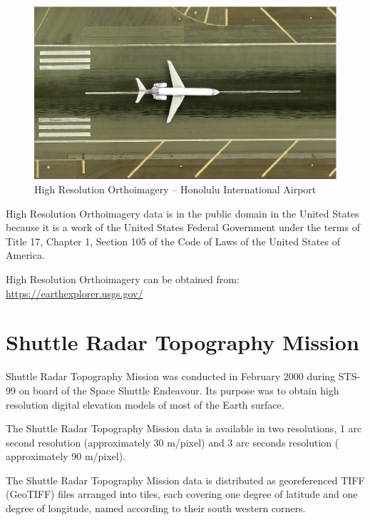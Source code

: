 \begin{figure}[h!]
  \centering
  \includegraphics[width=120mm]{eps/usgs_hro_honolulu_intl.eps}
  \caption{High Resolution Orthoimagery -- Honolulu International Airport}
\end{figure}

High Resolution Orthoimagery data is in the public domain in the United States because it is a work of the United States Federal Government under the terms of Title 17, Chapter 1, Section 105 of the Code of Laws of the United States of America.

High Resolution Orthoimagery can be obtained from: \cite{Terrain-EarthExplorer} \\
\url{https://earthexplorer.usgs.gov/}

\section{Shuttle Radar Topography Mission}

Shuttle Radar Topography Mission was conducted in February 2000 during STS-99 on board of the Space Shuttle Endeavour. Its purpose was to obtain high resolution digital elevation models of most of the Earth surface.

The Shuttle Radar Topography Mission data is available in two resolutions, 1 arc second resolution (approximately 30 m/pixel) and 3 arc seconds  resolution ( approximately 90 m/pixel).

The Shuttle Radar Topography Mission data is distributed as georeferenced TIFF (GeoTIFF) files arranged into tiles, each covering one degree of latitude and one degree of longitude, named according to their south western corners.

